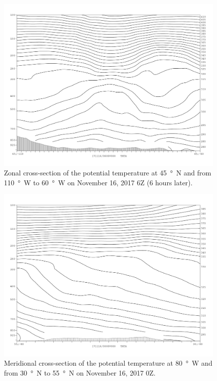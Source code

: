 \documentclass[11pt]{article}
\begin{document}
\begin{figure}[h!]
  \centering
  \includegraphics[width=\textwidth]{thta_171116_6Z_moreEast}
  \caption{Zonal cross-section of the potential temperature at \SI{45}{\degree N} and from \SI{110}{\degree W} to \SI{60}{\degree W} on November 16, 2017 6Z (6 hours later).}
  \label{fig:thta_171116_6Z_EW}
\end{figure}


\begin{figure}[h!]
  \centering
  \includegraphics[width=\textwidth]{thta_171116_0Z_NS_lon80W}
  \caption{Meridional cross-section of the potential temperature at \SI{80}{\degree W} and from \SI{30}{\degree N} to \SI{55}{\degree N} on November 16, 2017 0Z.}
  \label{fig:thta_171116_0Z_NS_lon80W}
\end{figure}
\end{document}
